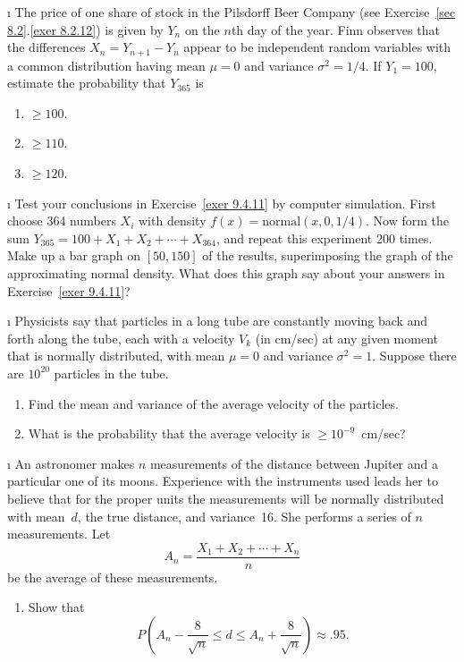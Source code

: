 \begin{LJSItem}
\i\label{exer 9.4.11} The price of one share of stock in the Pilsdorff Beer
Company (see Exercise~\ref{sec 8.2}.\ref{exer 8.2.12}) is given by $Y_n$ on the $n$th day of
the year.  Finn observes that the differences $X_n = Y_{n + 1} - Y_n$ appear to
be independent random variables with a common distribution having mean $\mu =
0$ and variance $\sigma^2 = 1/4$.  If $Y_1 = 100$, estimate the probability
that $Y_{365}$ is
\begin{enumerate}
\item  ${} \geq 100$.

\item  ${} \geq 110$.

\item  ${} \geq 120$.
\end{enumerate}

\i\label{exer 9.4.12}  Test your conclusions in Exercise~\ref{exer 9.4.11} by computer
simulation.  First choose 364 numbers $X_i$ with density $f(x) =
\mbox {normal}(x,0,1/4)$.  Now form the sum $Y_{365} = 100 + X_1 + X_2 +\cdots+
X_{364}$, and repeat this experiment 200 times.  Make up a bar graph on
$[50,150]$ of the results, superimposing the graph of the approximating normal
density.  What does this graph say about your answers in Exercise~\ref{exer
9.4.11}?

\i\label{exer 9.4.12.5}  Physicists say that particles in a long tube are constantly moving 
back and forth along the tube, each with a velocity $V_k$ (in cm/sec) at any given
moment that is normally distributed, with mean $\mu = 0$ and variance $\sigma^2
= 1$.  Suppose there are $10^{20}$ particles in the tube.
\begin{enumerate}
\item  Find the mean and variance of the average velocity of the particles.

\item  What is the probability that the average velocity is ${} \geq
10^{-9}$~cm/sec?
\end{enumerate}

\i\label{exer 9.4.13}  An astronomer makes $n$ measurements of the distance between
Jupiter and a particular one of its moons.  Experience with the instruments used leads
her to believe that for the proper units the measurements will be normally
distributed with mean~$d$, the true distance, and variance~16.  She performs a
series of $n$ measurements.  Let
$$
A_n = \frac {X_1 + X_2 +\cdots+ X_n}n
$$
be the average of these measurements.
\begin{enumerate}
\item  Show that
\[
P\left(A_n - \frac 8{\sqrt n} \leq d \leq A_n + \frac 8{\sqrt n}\right) \approx
.95.
\]


\end{enumerate}
\end{LJSItem}
